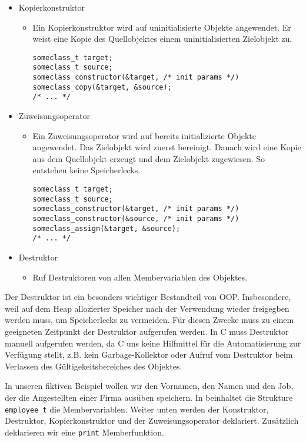 \begin{itemize}
 \item Kopierkonstruktor
	 \begin{itemize}
		 \item Ein Kopierkonstruktor wird auf uninitialisierte Objekte angewendet. Er weist eine Kopie des Quellobjektes einem uninitialisierten Zielobjekt zu.
\begin{verbatim}
someclass_t target;
someclass_t source;
someclass_constructor(&target, /* init params */)
someclass_copy(&target, &source);
/* ... */
\end{verbatim}
	 \end{itemize}
 \item Zuweisungsoperator
	 \begin{itemize}
		 \item Ein Zuweisungsoperator wird auf bereits initializierte Objekte angewendet. Das Zielobjekt wird zuerst bereinigt. Danach wird eine Kopie aus dem Quellobjekt erzeugt und dem Zielobjekt zugewiesen. So entstehen keine Speicherlecks.
\begin{verbatim}
someclass_t target;
someclass_t source;
someclass_constructor(&target, /* init params */)
someclass_constructor(&source, /* init params */)
someclass_assign(&target, &source);
/* ... */
\end{verbatim}
	 \end{itemize}
 \item Destruktor
	 \begin{itemize}
		 \item Ruf Destruktoren von allen Membervariablen des Objektes.
	 \end{itemize}
\end{itemize}

Der Destruktor ist ein besonders wichtiger Bestandteil von OOP.
Insbesondere, weil auf dem Heap allozierter Speicher nach der Verwendung wieder freigegben werden muss, um Speicherlecks zu vermeiden.
Für diesen Zwecke muss zu einem geeigneten Zeitpunkt der Destruktor aufgerufen werden.
In C muss Destruktor manuell aufgerufen werden, da C uns keine Hilfmittel für die Automatisierung zur Verfügung stellt, z.B. kein Garbage-Kollektor oder Aufruf vom Destruktor beim Verlassen des Gültigekeitsbereiches des Objektes.

In unseren fiktiven Beispiel wollen wir den Vornamen, den Namen und den Job, der die Angestellten einer Firma ausüben speichern.
In  beinhaltet die Strukture \texttt{employee_t} die Membervariablen.
Weiter unten werden der Konstruktor, Destruktor, Kopierkonstruktor und der Zuweisungsoperator deklariert.
Zusätzlich deklarieren wir eine \texttt{print} Memberfunktion.


